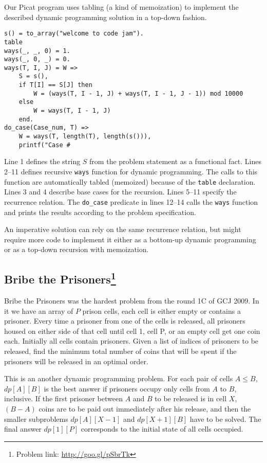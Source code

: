\documentclass{llncs}
\begin{document}
Our Picat program uses tabling \cite{warren1992memoing} (a kind of memoization) to implement the described dynamic programming solution in a top-down fashion.

\begin{lstlisting}[caption={Picat solution for the ``Welcome to Code Jam'' problem}]
s() = to_array("welcome to code jam").
table
ways(_, _, 0) = 1.
ways(_, 0, _) = 0.
ways(T, I, J) = W =>
    S = s(),
    if T[I] == S[J] then
        W = (ways(T, I - 1, J) + ways(T, I - 1, J - 1)) mod 10000
    else
        W = ways(T, I - 1, J)
    end.
do_case(Case_num, T) =>
    W = ways(T, length(T), length(s())),
    printf("Case #\end{lstlisting}

Line 1 defines the string $S$ from the problem statement as a functional fact.
Lines 2--11 defines recursive \texttt{ways} function for dynamic programming. The calls to this function are automatically tabled (memoized) because of the \texttt{table} declaration.
Lines 3 and 4 describe base cases for the recursion. Lines 5--11 specify the recurrence relation.
The \texttt{do\_case} predicate in lines 12--14 calls the \texttt{ways} function and prints the results according to the problem specification.

An imperative solution can rely on the same recurrence relation, but might require more code to implement it either as a bottom-up dynamic programming or as a top-down recursion with memoization.


\subsection*{Bribe the Prisoners\footnote{Problem link: \url{http://goo.gl/pSbrTk}}}

Bribe the Prisoners was the hardest problem from the round 1C of GCJ 2009.
In it we have an array of $P$ prison cells, each cell is either empty or contains a prisoner. Every time a prisoner from one of the cells is released, all prisoners housed on either side of that cell until cell 1, cell P, or an empty cell get one coin each. Initially all cells contain prisoners.
Given a list of indices of prisoners to be released, find the minimum total number of coins that will be spent if the prisoners will be released in an optimal order.

This is an another dynamic programming problem. For each pair of cells $A \leq B$, $dp[A][B]$ is the best answer if prisoners occupy only cells from $A$ to $B$, inclusive.
If the first prisoner between $A$ and $B$ to be released is in cell $X$, $(B - A)$ coins are to be paid out immediately after his release, and then the smaller subproblems $dp[A][X-1]$ and $dp[X+1][B]$ have to be solved. The final answer $dp[1][P]$ corresponds to the initial state of all cells occupied.
\end{document}

